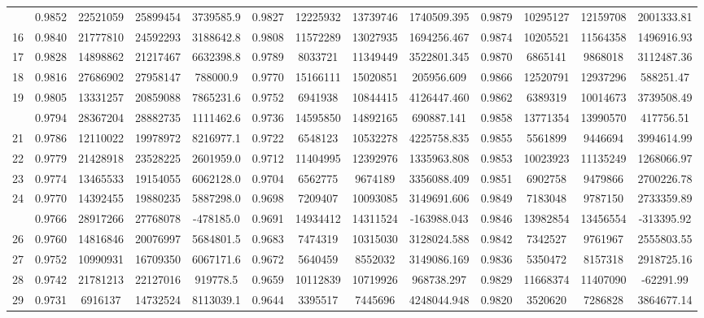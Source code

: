 \documentclass[
  12pt,
]{article}
\begin{document}
\begin{longtable}[t]{lcccccccccccc}
\addlinespace
15 & 0.9852 & 22521059 & 25899454 & 3739585.9 & 0.9827 & 12225932 & 13739746 & 1740509.395 & 0.9879 & 10295127 & 12159708 & 2001333.81\\
16 & 0.9840 & 21777810 & 24592293 & 3188642.8 & 0.9808 & 11572289 & 13027935 & 1694256.467 & 0.9874 & 10205521 & 11564358 & 1496916.93\\
17 & 0.9828 & 14898862 & 21217467 & 6632398.8 & 0.9789 & 8033721 & 11349449 & 3522801.345 & 0.9870 & 6865141 & 9868018 & 3112487.36\\
18 & 0.9816 & 27686902 & 27958147 & 788000.9 & 0.9770 & 15166111 & 15020851 & 205956.609 & 0.9866 & 12520791 & 12937296 & 588251.47\\
19 & 0.9805 & 13331257 & 20859088 & 7865231.6 & 0.9752 & 6941938 & 10844415 & 4126447.460 & 0.9862 & 6389319 & 10014673 & 3739508.49\\
\addlinespace
20 & 0.9794 & 28367204 & 28882735 & 1111462.6 & 0.9736 & 14595850 & 14892165 & 690887.141 & 0.9858 & 13771354 & 13990570 & 417756.51\\
21 & 0.9786 & 12110022 & 19978972 & 8216977.1 & 0.9722 & 6548123 & 10532278 & 4225758.835 & 0.9855 & 5561899 & 9446694 & 3994614.99\\
22 & 0.9779 & 21428918 & 23528225 & 2601959.0 & 0.9712 & 11404995 & 12392976 & 1335963.808 & 0.9853 & 10023923 & 11135249 & 1268066.97\\
23 & 0.9774 & 13465533 & 19154055 & 6062128.0 & 0.9704 & 6562775 & 9674189 & 3356088.409 & 0.9851 & 6902758 & 9479866 & 2700226.78\\
24 & 0.9770 & 14392455 & 19880235 & 5887298.0 & 0.9698 & 7209407 & 10093085 & 3149691.606 & 0.9849 & 7183048 & 9787150 & 2733359.89\\
\addlinespace
25 & 0.9766 & 28917266 & 27768078 & -478185.0 & 0.9691 & 14934412 & 14311524 & -163988.043 & 0.9846 & 13982854 & 13456554 & -313395.92\\
26 & 0.9760 & 14816846 & 20076997 & 5684801.5 & 0.9683 & 7474319 & 10315030 & 3128024.588 & 0.9842 & 7342527 & 9761967 & 2555803.55\\
27 & 0.9752 & 10990931 & 16709350 & 6067171.6 & 0.9672 & 5640459 & 8552032 & 3149086.169 & 0.9836 & 5350472 & 8157318 & 2918725.16\\
28 & 0.9742 & 21781213 & 22127016 & 919778.5 & 0.9659 & 10112839 & 10719926 & 968738.297 & 0.9829 & 11668374 & 11407090 & -62291.99\\
29 & 0.9731 & 6916137 & 14732524 & 8113039.1 & 0.9644 & 3395517 & 7445696 & 4248044.948 & 0.9820 & 3520620 & 7286828 & 3864677.14\\

\end{longtable}
\end{document}
